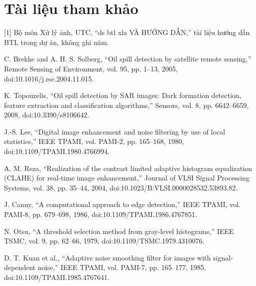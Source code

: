 \documentclass[12pt,a4paper]{extreport}
\begin{document}
\section*{Tài liệu tham khảo}
[1] Bộ môn Xử lý ảnh,\allowbreak{} UTC,\allowbreak{} “ds btl xla VÀ HƯỚNG DẪN,\allowbreak{}” tài liệu hướng dẫn BTL trong dự án,\allowbreak{} không ghi năm.
\par
[2] C. Brekke and A. H. S. Solberg,\allowbreak{} “Oil spill detection by satellite remote sensing,\allowbreak{}” Remote Sensing of Environment,\allowbreak{} vol. 95,\allowbreak{} pp. 1–13,\allowbreak{} 2005,\allowbreak{} doi:10.1016/\allowbreak{}j.rse.2004.11.015.
\par
[3] K. Topouzelis,\allowbreak{} “Oil spill detection by SAR images: Dark formation detection,\allowbreak{} feature extraction and classification algorithms,\allowbreak{}” Sensors,\allowbreak{} vol. 8,\allowbreak{} pp. 6642–6659,\allowbreak{} 2008,\allowbreak{} doi:10.3390/\allowbreak{}s8106642.
\par
[4] J.-S. Lee,\allowbreak{} “Digital image enhancement and noise filtering by use of local statistics,\allowbreak{}” IEEE TPAMI,\allowbreak{} vol. PAMI-2,\allowbreak{} pp. 165–168,\allowbreak{} 1980,\allowbreak{} doi:10.1109/\allowbreak{}TPAMI.1980.4766994.
\par
[5] A. M. Reza,\allowbreak{} “Realization of the contrast limited adaptive histogram equalization (CLAHE) for real-time image enhancement,\allowbreak{}” Journal of VLSI Signal Processing Systems,\allowbreak{} vol. 38,\allowbreak{} pp. 35–44,\allowbreak{} 2004,\allowbreak{} doi:10.1023/\allowbreak{}B:VLSI.0000028532.53893.82.
\par
[6] J. Canny,\allowbreak{} “A computational approach to edge detection,\allowbreak{}” IEEE TPAMI,\allowbreak{} vol. PAMI-8,\allowbreak{} pp. 679–698,\allowbreak{} 1986,\allowbreak{} doi:10.1109/\allowbreak{}TPAMI.1986.4767851.
\par
[7] N. Otsu,\allowbreak{} “A threshold selection method from gray-level histograms,\allowbreak{}” IEEE TSMC,\allowbreak{} vol. 9,\allowbreak{} pp. 62–66,\allowbreak{} 1979,\allowbreak{} doi:10.1109/\allowbreak{}TSMC.1979.4310076.
\par
[8] D. T. Kuan et al.,\allowbreak{} “Adaptive noise smoothing filter for images with signal-dependent noise,\allowbreak{}” IEEE TPAMI,\allowbreak{} vol. PAMI-7,\allowbreak{} pp. 165–177,\allowbreak{} 1985,\allowbreak{} doi:10.1109/\allowbreak{}TPAMI.1985.4767641.
\par
\end{document}
